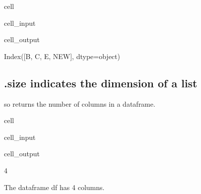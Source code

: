 \documentclass[letterpaper,10pt,english]{jupyterBook}
\begin{document}
\begin{sphinxuseclass}{cell}\begin{sphinxVerbatimInput}

\begin{sphinxuseclass}{cell_input}
\begin{sphinxVerbatim}[commandchars=\\\{\}]
\end{sphinxVerbatim}

\end{sphinxuseclass}\end{sphinxVerbatimInput}
\begin{sphinxVerbatimOutput}

\begin{sphinxuseclass}{cell_output}
\begin{sphinxVerbatim}[commandchars=\\\{\}]
Index([\PYGZsq{}B\PYGZsq{}, \PYGZsq{}C\PYGZsq{}, \PYGZsq{}E\PYGZsq{}, \PYGZsq{}NEW\PYGZsq{}], dtype=\PYGZsq{}object\PYGZsq{})
\end{sphinxVerbatim}

\end{sphinxuseclass}\end{sphinxVerbatimOutput}

\end{sphinxuseclass}

\subsection{.size indicates the dimension of a list}
\label{\detokenize{content/04_PythonEssentials/PythonPandasDataframes:size-indicates-the-dimension-of-a-list}}
\sphinxAtStartPar
so  returns the number of columns in a dataframe.

\begin{sphinxuseclass}{cell}\begin{sphinxVerbatimInput}

\begin{sphinxuseclass}{cell_input}
\begin{sphinxVerbatim}[commandchars=\\\{\}]
\end{sphinxVerbatim}

\end{sphinxuseclass}\end{sphinxVerbatimInput}
\begin{sphinxVerbatimOutput}

\begin{sphinxuseclass}{cell_output}
\begin{sphinxVerbatim}[commandchars=\\\{\}]
4
\end{sphinxVerbatim}

\end{sphinxuseclass}\end{sphinxVerbatimOutput}

\end{sphinxuseclass}
\sphinxAtStartPar
The dataframe df has 4 columns.
\end{document}

